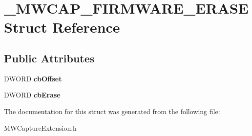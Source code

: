 \hypertarget{struct__MWCAP__FIRMWARE__ERASE}{\section{\-\_\-\-M\-W\-C\-A\-P\-\_\-\-F\-I\-R\-M\-W\-A\-R\-E\-\_\-\-E\-R\-A\-S\-E Struct Reference}
\label{struct__MWCAP__FIRMWARE__ERASE}
}
\subsection*{Public Attributes}
\begin{DoxyCompactItemize}
\item 
\hypertarget{struct__MWCAP__FIRMWARE__ERASE_a8a64549138c9b54defe6dccb999ffc82}{D\-W\-O\-R\-D {\bfseries cb\-Offset}}\label{struct__MWCAP__FIRMWARE__ERASE_a8a64549138c9b54defe6dccb999ffc82}

\item 
\hypertarget{struct__MWCAP__FIRMWARE__ERASE_a76f7e642d168f963e759522960bb4d59}{D\-W\-O\-R\-D {\bfseries cb\-Erase}}\label{struct__MWCAP__FIRMWARE__ERASE_a76f7e642d168f963e759522960bb4d59}

\end{DoxyCompactItemize}


The documentation for this struct was generated from the following file\-:\begin{DoxyCompactItemize}
\item 
M\-W\-Capture\-Extension.\-h\end{DoxyCompactItemize}
